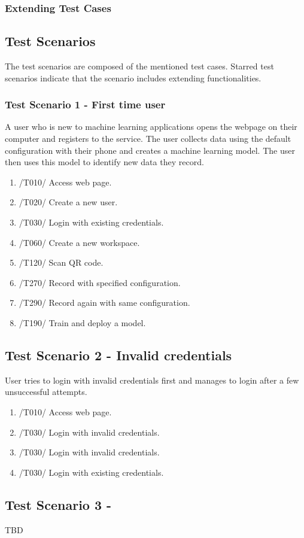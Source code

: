 \subsubsection{Extending Test Cases}
\subsection{Test Scenarios}
The test scenarios are composed of the mentioned test cases. Starred test scenarios indicate that the scenario includes extending functionalities.
\subsubsection{Test Scenario 1 - First time user}
A user who is new to machine learning applications opens the webpage on their computer and registers to the service. The user collects data using the default configuration with their phone and creates a machine learning model. The user then uses this model to identify new data they record. 
\newpage
\begin{enumerate}
    \item /T010/ Access web page.
    \item /T020/ Create a new user.
    \item /T030/ Login with existing credentials.
    \item /T060/ Create a new workspace.
    \item /T120/ Scan QR code.
    \item /T270/ Record with specified configuration.
    \item /T290/ Record again with same configuration.
    \item /T190/ Train and deploy a model.
\end{enumerate}
\subsection{Test Scenario 2 - Invalid credentials}
User tries to login with invalid credentials first and manages to login after a few unsuccessful attempts.
\begin{enumerate}
    \item /T010/ Access web page.
    \item /T030/ Login with invalid credentials.
    \item /T030/ Login with invalid credentials.
    \item /T030/ Login with existing credentials.
\end{enumerate}
\subsection{Test Scenario 3 - }
TBD
